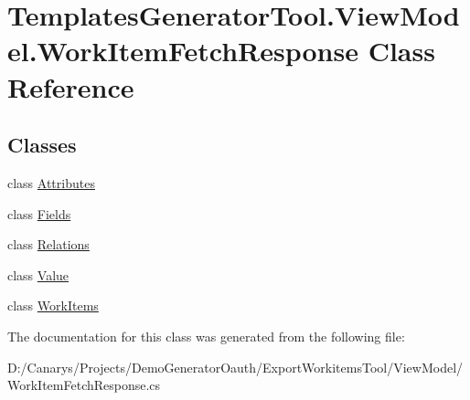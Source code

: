 \hypertarget{class_templates_generator_tool_1_1_view_model_1_1_work_item_fetch_response}{}\section{Templates\+Generator\+Tool.\+View\+Model.\+Work\+Item\+Fetch\+Response Class Reference}
\label{class_templates_generator_tool_1_1_view_model_1_1_work_item_fetch_response}
\subsection*{Classes}
\begin{DoxyCompactItemize}
\item 
class \mbox{\hyperlink{class_templates_generator_tool_1_1_view_model_1_1_work_item_fetch_response_1_1_attributes}{Attributes}}
\item 
class \mbox{\hyperlink{class_templates_generator_tool_1_1_view_model_1_1_work_item_fetch_response_1_1_fields}{Fields}}
\item 
class \mbox{\hyperlink{class_templates_generator_tool_1_1_view_model_1_1_work_item_fetch_response_1_1_relations}{Relations}}
\item 
class \mbox{\hyperlink{class_templates_generator_tool_1_1_view_model_1_1_work_item_fetch_response_1_1_value}{Value}}
\item 
class \mbox{\hyperlink{class_templates_generator_tool_1_1_view_model_1_1_work_item_fetch_response_1_1_work_items}{Work\+Items}}
\end{DoxyCompactItemize}


The documentation for this class was generated from the following file\+:\begin{DoxyCompactItemize}
\item 
D\+:/\+Canarys/\+Projects/\+Demo\+Generator\+Oauth/\+Export\+Workitems\+Tool/\+View\+Model/Work\+Item\+Fetch\+Response.\+cs\end{DoxyCompactItemize}
